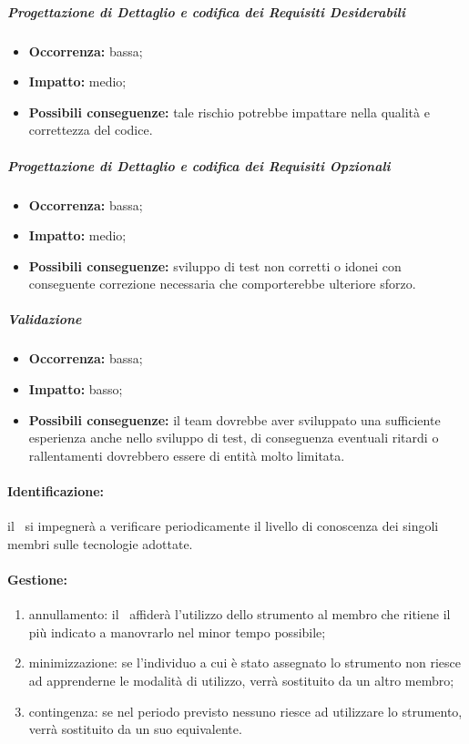 \documentclass[../PianoProgetto.tex]{subfiles}
\begin{document}
		\subparagraph*{Progettazione di Dettaglio e codifica dei Requisiti Desiderabili}
			\begin{itemize}[label={-}]
				\item \textbf{Occorrenza:} bassa;
				\item \textbf{Impatto:} medio;
				\item \textbf{Possibili conseguenze:} tale rischio potrebbe impattare nella qualità e correttezza del codice.
			\end{itemize}
		\subparagraph*{Progettazione di Dettaglio e codifica dei Requisiti Opzionali}
			\begin{itemize}[label={-}]
				\item \textbf{Occorrenza:} bassa;
				\item \textbf{Impatto:} medio;
				\item \textbf{Possibili conseguenze:} sviluppo di test non corretti o idonei con conseguente correzione necessaria che comporterebbe ulteriore sforzo.
			\end{itemize}
		\subparagraph*{Validazione}
			\begin{itemize}[label={-}]
				\item \textbf{Occorrenza:} bassa;
				\item \textbf{Impatto:} basso;
				\item \textbf{Possibili conseguenze:} il team dovrebbe aver sviluppato una sufficiente esperienza anche nello sviluppo di test, di conseguenza eventuali ritardi o rallentamenti dovrebbero essere di entità molto limitata. 
			\end{itemize}
	
	\paragraph*{Identificazione:} il \responsabilediprogetto\ si impegnerà a verificare periodicamente il livello di conoscenza dei singoli membri sulle tecnologie adottate.
	
	\paragraph*{Gestione:}
	\begin{enumerate}
		\item annullamento: il \responsabilediprogetto\ affiderà l'utilizzo dello strumento al membro che ritiene il più indicato a manovrarlo nel minor tempo possibile;
		\item minimizzazione: se l'individuo a cui è stato assegnato lo strumento non riesce ad apprenderne le modalità di utilizzo, verrà sostituito da un altro membro;
		\item contingenza: se nel periodo previsto nessuno riesce ad utilizzare lo strumento, verrà sostituito da un suo equivalente. 
	\end{enumerate}		
	
\end{document}

